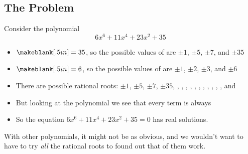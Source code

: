 \subsection{The Problem} 
Consider the polynomial
\[
6x^6+11x^4+23x^2+35
\]
\begin{itemize}
\item $\makeblank[.5in]=35$, so the possible values of \makeblank[.5in] are $\pm 1$, $\pm 5$, $\pm 7$, and $\pm 35$
\item $\makeblank[.5in]=6$, so the possible values of \makeblank[.5in] are $\pm 1$, $\pm 2$, $\pm 3$, and $\pm 6$
\item There are \makeblank[.5in] possible rational roots:
$\pm 1$, $\pm 5$, $\pm 7$, $\pm 35$,
, , , ,
, , , ,
, , , and 
\item But looking at the polynomial we see that every term is always \makeblank[1.5in]
\item So the equation $6x^6+11x^4+23x^2+35=0$ has \makeblank[1in] real solutions.
\end{itemize}
With other polynomials, it might not be as obvious, and we wouldn't want to have to try \emph{all} the rational roots to found out that \makeblank[1in] of them work.